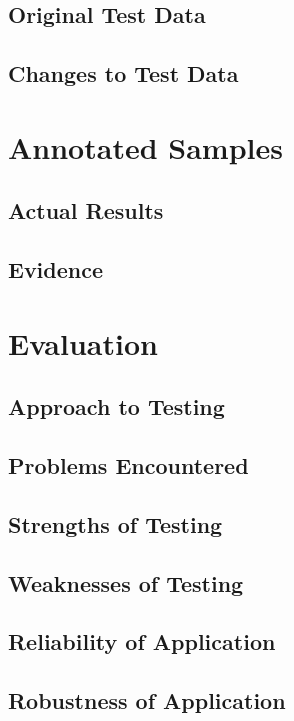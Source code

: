\begin{landscape}
\subsection{Original Test Data}

\subsection{Changes to Test Data}

\section{Annotated Samples}

\subsection{Actual Results}

\subsection{Evidence}

\end{landscape}

\section{Evaluation}

\subsection{Approach to Testing}

\subsection{Problems Encountered}

\subsection{Strengths of Testing}

\subsection{Weaknesses of Testing}

\subsection{Reliability of Application}

\subsection{Robustness of Application}